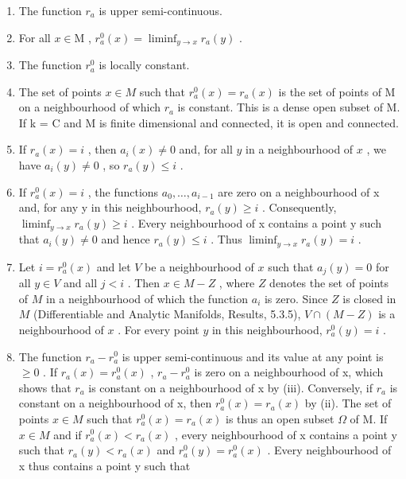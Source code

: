 \begin{enumerate}
\def\labelenumi{(\roman{enumi})}
\item
  The function \(r_a\) is upper semi-continuous.
\item
  For all \(x \in \mathrm{M}\) , \(r_a^0(x) = \liminf_{y \to x} r_a(y)\) .
\item
  The function \(r_a^0\) is locally constant.
\item
  The set of points \(x \in M\) such that \(r_{a}^{0}(x) = r_{a}(x)\) is the set of points of M on a neighbourhood of which \(r_{a}\) is constant. This is a dense open subset of M. If k = C and M is finite dimensional and connected, it is open and connected.
\item
  If \(r_a(x) = i\) , then \(a_i(x) \neq 0\) and, for all \(y\) in a neighbourhood of \(x\) , we have \(a_i(y) \neq 0\) , so \(r_a(y) \leq i\) .
\item
  If \(r_{a}^{0}(x) = i\) , the functions \(a_{0}, \ldots, a_{i-1}\) are zero on a neighbourhood of x and, for any y in this neighbourhood, \(r_{a}(y) \geq i\) . Consequently, \(\liminf_{y \to x} r_{a}(y) \geq i\) . Every neighbourhood of x contains a point y such that \(a_{i}(y) \neq 0\) and hence \(r_{a}(y) \leq i\) . Thus \(\liminf_{y \to x} r_{a}(y) = i\) .
\item
  Let \(i = r_a^0 (x)\) and let \(V\) be a neighbourhood of \(x\) such that \(a_{j}(y) = 0\) for all \(y\in V\) and all \(j < i\) . Then \(x\in M - Z\) , where \(Z\) denotes the set of points of \(M\) in a neighbourhood of which the function \(a_{i}\) is zero. Since \(Z\) is closed in \(M\) (Differentiable and Analytic Manifolds, Results, 5.3.5), \(V\cap (M - Z)\) is a neighbourhood of \(x\) . For every point \(y\) in this neighbourhood, \(r_a^0 (y) = i\) .
\item
  The function \(r_{a}-r_{a}^{0}\) is upper semi-continuous and its value at any point is \(\geq0\) . If \(r_{a}(x)=r_{a}^{0}(x)\) , \(r_{a}-r_{a}^{0}\) is zero on a neighbourhood of x, which shows that \(r_{a}\) is constant on a neighbourhood of x by (iii). Conversely, if \(r_{a}\) is constant on a neighbourhood of x, then \(r_{a}^{0}(x)=r_{a}(x)\) by (ii). The set of points \(x\in M\) such that \(r_{a}^{0}(x)=r_{a}(x)\) is thus an open subset \(\Omega\) of M. If \(x\in M\) and if \(r_{a}^{0}(x)<r_{a}(x)\) , every neighbourhood of x contains a point y such that \(r_{a}(y)<r_{a}(x)\) and \(r_{a}^{0}(y)=r_{a}^{0}(x)\) . Every neighbourhood of x thus contains a point y such that
\end{enumerate}

